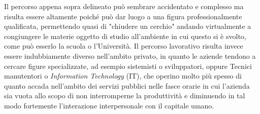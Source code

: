         \par
            Il percorso appena sopra delineato può sembrare accidentato e complesso ma risulta essere altamente poiché può dar luogo a una figura professionalmente qualificata, permettendo quasi di "chiudere un cerchio" andando virtualmente a congiungere le materie oggetto di studio all'ambiente in cui questo si è svolto, come può esserlo la scuola o l'Università. \newline
            Il percorso lavorativo risulta invece essere indubbiamente diverso nell'ambito privato, in quanto le aziende tendono a cercare figure specializzate, ad esempio sistemisti o sviluppatori, oppure Tecnici manutentori o \textit{Information Technology} (IT), che operino molto più spesso di quanto accada nell'ambito dei servizi pubblici nelle fasce orarie in cui l'azienda sia vuota allo scopo di non interromperne la produttività e diminuendo in tal modo fortemente l'interazione interpersonale con il capitale umano. 